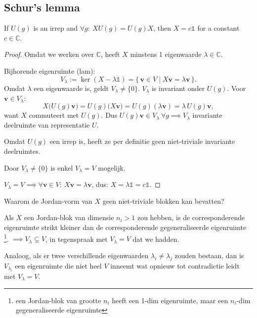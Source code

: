 

\subsection{Schur's lemma}

\begin{theorem}
    If \(U(g)\) is an irrep and \(\forall g : \ XU(g) = U(g)X\), then \(X = c \mathds{1}\) for a constant \(c \in \mathbb{C}\).
\end{theorem}

\begin{proof}
    Omdat we werken over \(\mathbb{C}\), heeft \(X\) minstens 1 eigenwaarde \(\lambda \in \mathbb{C}\).

    Bijhorende eigenruimte (lam):
    \[
        V_\lambda := \ker(X - \lambda\mathds{1}) = \{\, \bm v \in V \mid X \bm v = \lambda \bm v \,\}.
    \]
    Omdat \(\lambda\) een eigenwaarde is, geldt \(V_\lambda \neq \{0\}\).
    \(V_\lambda\) is invariant onder \(U(g)\). Voor \(\bm v \in V_\lambda\):
    \[
        X\big(U(g) \bm v\big) = U(g)\big(X \bm v\big) = U(g)(\lambda \bm v) = \lambda\, U(g) \bm v,
    \]
    want \(X\) commuteert met \(U(g)\). Dus \(U(g) \bm v \in V_\lambda \ \forall g \implies V_\lambda\) invariante deelruimte van representatie \(U\).

    Omdat \(U(g)\) een irrep is, heeft ze per definitie geen niet-triviale invariante deelruimtes.

    Door \(V_\lambda \neq \{0\}\) is enkel \( V_\lambda = V \) mogelijk.

  \(V_\lambda = V \implies \forall \bm v \in V: \ X \bm v = \lambda \bm v\), dus:
    \(
        X = \lambda \mathds{1}  = c \mathds{1}
    \).
\end{proof}

 Waarom de Jordan-vorm van \(X\) geen niet-triviale blokken kan bevatten?

 Als \(X\) een Jordan-blok van dimensie \(n_i>1\) zou hebben,
 is de corresponderende eigenruimte strikt kleiner dan de corresponderende gegeneraliseerde eigenruimte \footnote{een Jordan-blok van grootte \(n_i\) heeft een 1-dim eigenruimte,
 maar een \(n_i\)-dim gegeneraliseerde eigenruimte}.  \(\implies V_\lambda \subsetneq V\), in tegenspraak met \(V_\lambda = V\) dat we hadden.

 Analoog, als er twee verschillende eigenwaarden \(\lambda_i \neq \lambda_j\) zouden bestaan, dan is \(V_{\lambda_i}\) een eigenruimte die niet heel \(V\) inneemt wat opnieuw tot contradictie leidt met \(V_\lambda = V\).


